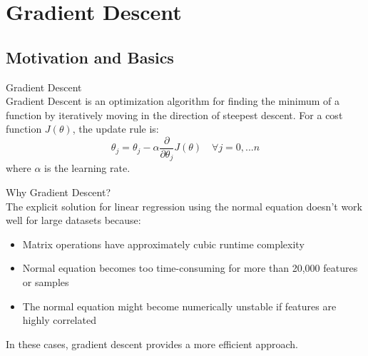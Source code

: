\section{Gradient Descent}

\subsection{Motivation and Basics}

\begin{definition}{Gradient Descent}\\
Gradient Descent is an optimization algorithm for finding the minimum of a function by iteratively moving in the direction of steepest descent. For a cost function $J(\theta)$, the update rule is:
\[\theta_j = \theta_j - \alpha \frac{\partial}{\partial\theta_j}J(\theta) \quad \forall j = 0,...n\]
where $\alpha$ is the learning rate.
\end{definition}

\begin{concept}{Why Gradient Descent?}\\
The explicit solution for linear regression using the normal equation doesn't work well for large datasets because:
\begin{itemize}
    \item Matrix operations have approximately cubic runtime complexity
    \item Normal equation becomes too time-consuming for more than 20,000 features or samples
    \item The normal equation might become numerically unstable if features are highly correlated
\end{itemize}
In these cases, gradient descent provides a more efficient approach.
\end{concept}

